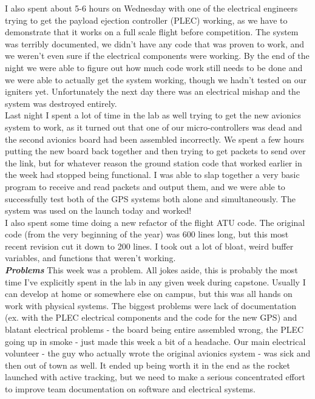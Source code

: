 \documentclass[onecolumn, draftclsnofoot, 10pt, compsoc]{IEEEtran}
\begin{document}
I also spent about 5-6 hours on Wednesday with one of the electrical engineers trying to get the payload ejection controller (PLEC) working, as we have to demonstrate that it works on a full scale flight before competition. The system was terribly documented, we didn't have any code that was proven to work, and we weren't even sure if the electrical components were working. By the end of the night we were able to figure out how much code work still needs to be done and we were able to actually get the system working, though we hadn't tested on our igniters yet. Unfortunately the next day there was an electrical mishap and the system was destroyed entirely. \\

Last night I spent a lot of time in the lab as well trying to get the new avionics system to work, as it turned out that one of our micro-controllers was dead and the second avionics board had been assembled incorrectly. We spent a few hours putting the new board back together and then trying to get packets to send over the link, but for whatever reason the ground station code that worked earlier in the week had stopped being functional. I was able to slap together a very basic program to receive and read packets and output them, and we were able to successfully test both of the GPS systems both alone and simultaneously. The system was used on the launch today and worked! \\

I also spent some time doing a new refactor of the flight ATU code. The original code (from the very beginning of the year) was 600 lines long, but this most recent revision cut it down to 200 lines. I took out a lot of bloat, weird buffer variables, and functions that weren't working. \\

\textbf{\textit{{Problems}}}
\newline This week was a problem. All jokes aside, this is probably the most time I've explicitly spent in the lab in any given week during capstone. Usually I can develop at home or somewhere else on campus, but this was all hands on work with physical systems. The biggest problems were lack of documentation (ex. with the PLEC electrical components and the code for the new GPS) and blatant electrical problems - the board being entire assembled wrong, the PLEC going up in smoke - just made this week a bit of a headache. Our main electrical volunteer - the guy who actually wrote the original avionics system - was sick and then out of town as well. It ended up being worth it in the end as the rocket launched with active tracking, but we need to make a serious concentrated effort to improve team documentation on software and electrical systems. \\
\end{document}
